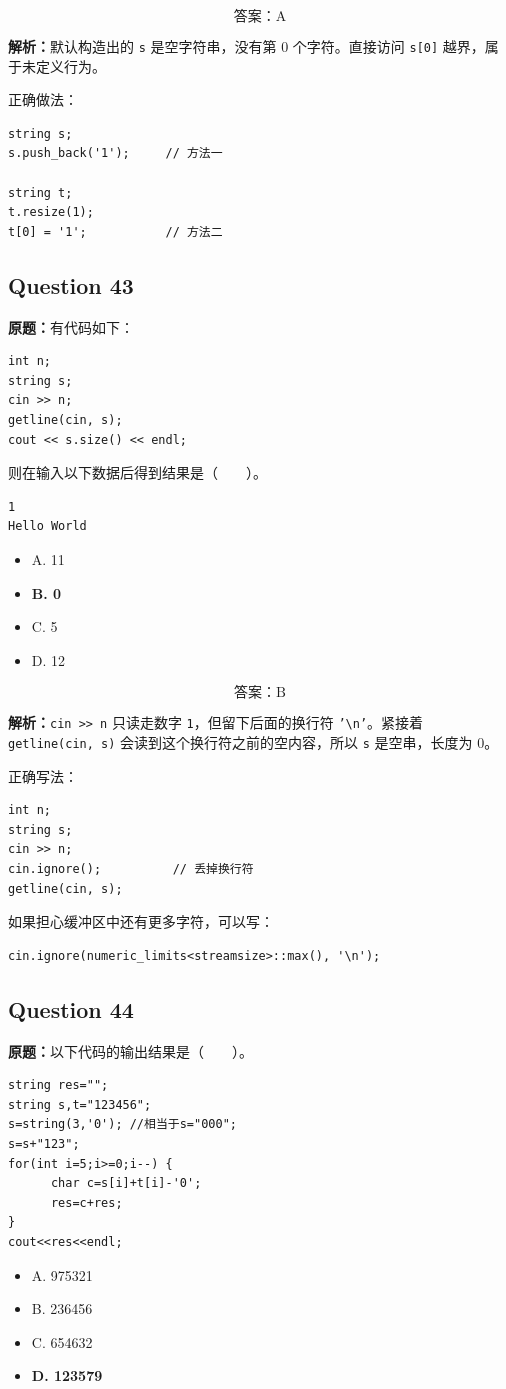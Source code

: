 \documentclass[11pt, a4paper]{article}
\begin{document}
\[
\boxed{\text{答案：A}}
\]

\textbf{解析：}默认构造出的 \texttt{s} 是空字符串，没有第 0 个字符。直接访问 \texttt{s[0]} 越界，属于未定义行为。

正确做法：
\begin{lstlisting}
string s;
s.push_back('1');     // 方法一

string t;
t.resize(1);
t[0] = '1';           // 方法二
\end{lstlisting}


\subsection*{Question 43}
\textbf{原题：}有代码如下：
\begin{lstlisting}
int n;
string s;
cin >> n;
getline(cin, s);
cout << s.size() << endl;
\end{lstlisting}
则在输入以下数据后得到结果是（~~~~）。
\begin{lstlisting}
1
Hello World
\end{lstlisting}
\begin{itemize}
    \item A. 11
    \item \textbf{B. 0}
    \item C. 5
    \item D. 12
\end{itemize}

\[
\boxed{\text{答案：B}}
\]

\textbf{解析：}\texttt{cin >> n} 只读走数字 \texttt{1}，但留下后面的换行符 \texttt{'\textbackslash n'}。紧接着 \texttt{getline(cin, s)} 会读到这个换行符之前的空内容，所以 \texttt{s} 是空串，长度为 0。

正确写法：
\begin{lstlisting}
int n;
string s;
cin >> n;
cin.ignore();          // 丢掉换行符
getline(cin, s);
\end{lstlisting}

如果担心缓冲区中还有更多字符，可以写：
\begin{lstlisting}
cin.ignore(numeric_limits<streamsize>::max(), '\n');
\end{lstlisting}


\subsection*{Question 44}
\textbf{原题：}以下代码的输出结果是（~~~~）。
\begin{lstlisting}
string res="";
string s,t="123456";
s=string(3,'0'); //相当于s="000";
s=s+"123";
for(int i=5;i>=0;i--) {
      char c=s[i]+t[i]-'0';
      res=c+res;
}
cout<<res<<endl;
\end{lstlisting}
\begin{itemize}
    \item A. 975321
    \item B. 236456
    \item C. 654632
    \item \textbf{D. 123579}
\end{itemize}
\end{document}
